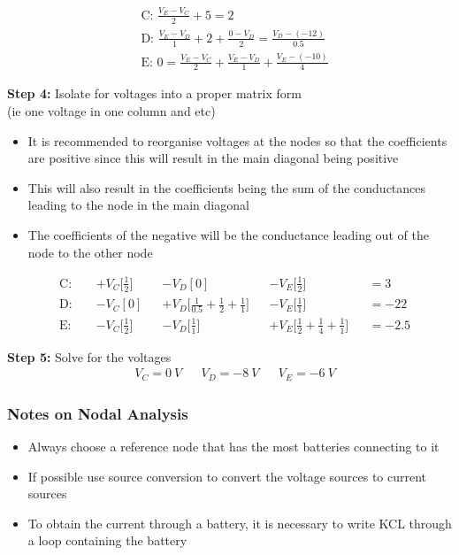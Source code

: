 \documentclass{template}
\begin{document}
\begin{align*}
    &\text{C: } \frac{V_E - V_C}{2} + 5 = 2 \\
    &\text{D: } \frac{V_E - V_D}{1} + 2 + \frac{0 - V_D}{2} = \frac{V_D - (-12)}{0.5} \\
    &\text{E: } 0 = \frac{V_E - V_C}{2} + \frac{V_E - V_D}{1} + \frac{V_E - (-10)}{4}
\end{align*}

\textbf{Step 4:} Isolate for voltages into a proper matrix form \\ %
(ie one voltage in one column and etc)
\begin {itemize}
    \item It is recommended to reorganise voltages at the nodes so that the coefficients are positive since this will result in the main diagonal being positive
    \item This will also result in the coefficients being the sum of the conductances leading to the node in the main diagonal
    \item The coefficients of the negative will be the conductance leading out of the node to the other node 
\end{itemize}
\begin{align*}
    &\text{C: } &&+V_C \bigg[\frac{1}{2}\bigg]  &&- V_D [0]                                                   &&- V_E \bigg[\frac{1}{2}\bigg]               &&= 3 \\
    &\text{D: } &&-V_C [0]                      &&+ V_D \bigg[\frac{1}{0.5} + \frac{1}{2} + \frac{1}{1}\bigg] &&- V_E \bigg[\frac{1}{1}\bigg]               &&= -22 \\
    &\text{E: } &&-V_C \bigg[\frac{1}{2}\bigg]  &&- V_D \bigg[\frac{1}{1}\bigg]                               &&+ V_E \bigg[\frac{1}{2} + \frac{1}{4} + \frac{1}{1}\bigg] &&= -2.5
\end{align*}

\textbf{Step 5:} Solve for the voltages %
\begin{align*}
    &V_C = 0 \: V &&V_D = -8 \: V &&V_E = -6 \: V
\end{align*}

\subsubsection*{Notes on Nodal Analysis} %
\begin {itemize}
    \item Always choose a reference node that has the most batteries connecting to it
    \item If possible use source conversion to convert the voltage sources to current sources
    \item To obtain the current through a battery, it is necessary to write KCL through a loop containing the battery
\end{itemize}
\end{document}
